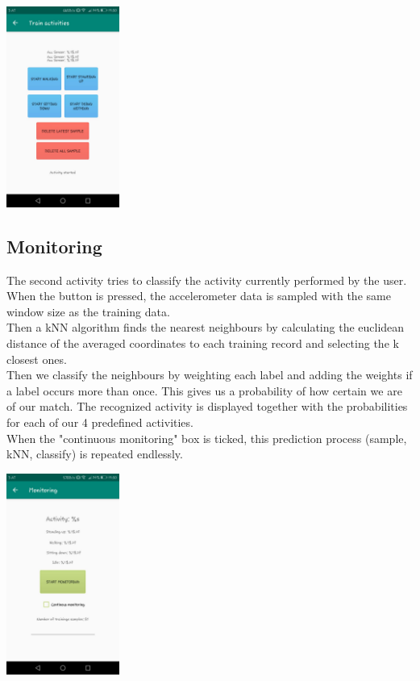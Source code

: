 \documentclass[12pt]{article}
\begin{document}
\begin{center}
  \includegraphics[width=140px]{images/train_activity}
\end{center}

\pagebreak

\subsection{Monitoring}
The second activity tries to classify the activity currently performed by the user. When the button is pressed, the accelerometer data is sampled with the same window size as the training data. 
\\
Then a kNN algorithm finds the nearest neighbours by calculating the euclidean distance of the averaged coordinates to each training record and selecting the k closest ones. 
\\
Then we classify the neighbours by weighting each label and adding the weights if a label occurs more than once. This gives us a probability of how certain we are of our match. The recognized activity is displayed together with the probabilities for each of our 4 predefined activities.
\\
When the "continuous monitoring" box is ticked, this prediction process (sample, kNN, classify) is repeated endlessly.

\begin{center}
  \includegraphics[width=140px]{images/monitoring.jpeg}
\end{center}
\end{document}
